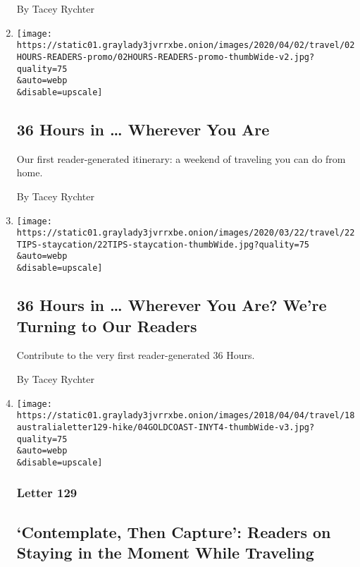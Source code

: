 \begin{enumerate}
  By Tacey Rychter
\item
  \href{/2020/04/02/travel/36-hours-quarantine.html}{}

  \texttt{[image: https://static01.graylady3jvrrxbe.onion/images/2020/04/02/travel/02HOURS-READERS-promo/02HOURS-READERS-promo-thumbWide-v2.jpg?quality=75\\\&auto=webp\\\&disable=upscale]}

  \hypertarget{36-hours-in--wherever-you-are}{%
  \subsection{36 Hours in \ldots{} Wherever You
  Are}\label{36-hours-in--wherever-you-are}}

  Our first reader-generated itinerary: a weekend of traveling you can
  do from home.

  By Tacey Rychter
\item
  \href{/2020/03/19/travel/36-hours-readers.html}{}

  \texttt{[image: https://static01.graylady3jvrrxbe.onion/images/2020/03/22/travel/22TIPS-staycation/22TIPS-staycation-thumbWide.jpg?quality=75\\\&auto=webp\\\&disable=upscale]}

  \hypertarget{36-hours-in--wherever-you-are-were-turning-to-our-readers}{%
  \subsection{36 Hours in \ldots{} Wherever You Are? We're Turning to
  Our
  Readers}\label{36-hours-in--wherever-you-are-were-turning-to-our-readers}}

  Contribute to the very first reader-generated 36 Hours.

  By Tacey Rychter
\item
  \href{/2019/10/18/world/australia/photographs-travel.html}{}

  \texttt{[image: https://static01.graylady3jvrrxbe.onion/images/2018/04/04/travel/18australialetter129-hike/04GOLDCOAST-INYT4-thumbWide-v3.jpg?quality=75\\\&auto=webp\\\&disable=upscale]}

  \hypertarget{letter-129}{%
  \subsubsection{Letter 129}\label{letter-129}}

  \hypertarget{contemplate-then-capture-readers-on-staying-in-the-moment-while-traveling}{%
  \subsection{`Contemplate, Then Capture': Readers on Staying in the
  Moment While
  Traveling}\label{contemplate-then-capture-readers-on-staying-in-the-moment-while-traveling}}


\end{enumerate}
